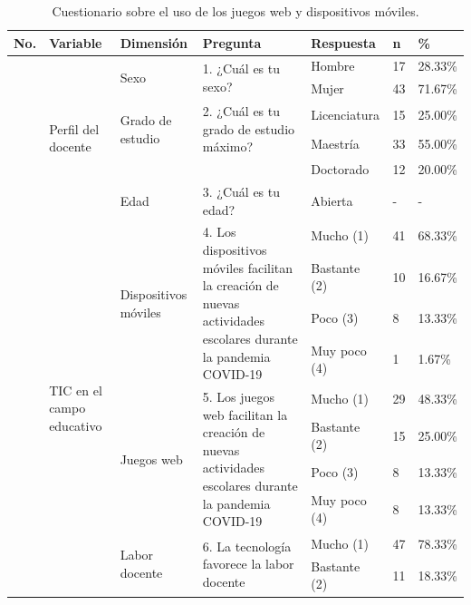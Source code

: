 \documentclass[spanish]{textolivre}
\begin{document}
\setlength\LTleft{-1in}
\setlength\LTright{-1in}
\begin{small}
\renewcommand{\arraystretch}{1.5}
\begin{longtable}{
    >{\raggedright\arraybackslash}p{}
    p{}p{}p{}p{}p{}p{}
    }
\caption{Cuestionario sobre el uso de los juegos web y dispositivos móviles.}
\label{tab1}
\\
\toprule
No. & Variable & Dimensión & Pregunta & Respuesta & n & \%
\\
\midrule
\multirow{6}{=}{1} & \multirow{6}{=}{Perfil del docente} & \multirow{2}{=}{Sexo} & \multirow{2}{=}{1. ¿Cuál es tu sexo?} & Hombre & 17 & 28.33\%
\\
& & & & Mujer & 43 & 71.67\%
\\
\arrayrulecolor[gray]{.7}
\cmidrule{3-7}
& & \multirow{2}{=}{Grado de estudio} & \multirow{2}{=}{2. ¿Cuál es tu grado de estudio máximo?} & Licenciatura & 15 & 25.00\%
\\
& & & & Maestría & 33 & 55.00\%
\\
& & & & Doctorado & 12 & 20.00\%
\\
\cmidrule{3-7}
& & Edad & 3. ¿Cuál es tu edad? & Abierta & - & -
\\
\midrule
\multirow{16}{=}{2} & \multirow{16}{=}{TIC en el campo educativo} & \multirow{4}{=}{Dispositivos móviles} & \multirow{4}{=}{4. Los dispositivos móviles facilitan la creación de nuevas actividades escolares durante la pandemia COVID-19} & Mucho (1) & 41 & 68.33\%
\\
& & & & Bastante (2) & 10 & 16.67\%
\\
& & & & Poco (3) & 8 & 13.33\%
\\
& & & & Muy poco (4) & 1 & 1.67\%
\\
\cmidrule{3-7}
& & \multirow{4}{=}{Juegos web} & \multirow{4}{=}{5. Los juegos web facilitan la creación de nuevas actividades escolares durante la pandemia COVID-19} & Mucho (1) & 29 & 48.33\%
\\
& & & & Bastante (2) & 15 & 25.00\%
\\
& & & & Poco (3) & 8 & 13.33\%
\\
& & & & Muy poco (4) & 8 & 13.33\%
\\
\cmidrule{3-7}
& & \multirow{4}{=}{Labor docente} & \multirow{4}{=}{6. La tecnología favorece la labor docente} & Mucho (1) & 47 & 78.33\%
\\
& & & & Bastante (2) & 11 & 18.33\%
\\

\end{longtable}
\end{small}
\end{document}
